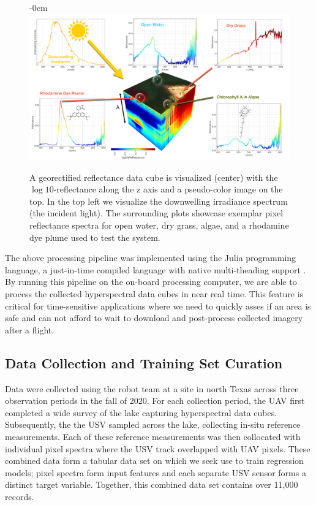 \documentclass[journal,article,submit,pdftex,moreauthors]{Definitions/mdpi}
\begin{document}
\begin{figure}[H]
\begin{adjustwidth}{-\extralength}{0cm}
\centering
\includegraphics[width=15.5cm]{paper/figures/materials-and-methods/HyperSpectralInfoGraphic.pdf}
\end{adjustwidth}
\caption{A georectified reflectance data cube is visualized (center) with the $\log10$-reflectance along the z axis and a pseudo-color image on the top. In the top left we visualize the downwelling irradiance spectrum (the incident light). The surrounding plots showcase exemplar pixel reflectance spectra for open water, dry grass, algae, and a rhodamine dye plume used to test the system.\label{fig:hsi-infographic}}
\end{figure}  
The above processing pipeline was implemented using the Julia programming language, a just-in-time compiled language with native multi-theading support \cite{julia-1}. By running this pipeline on the on-board processing computer, we are able to process the collected hyperspectral data cubes in near real time. This feature is critical for time-sensitive applications where we need to quickly asses if an area is safe and can not afford to wait to download and post-process collected imagery after a flight.

\subsection{Data Collection and Training Set Curation}

Data were collected using the robot team at a site in north Texas across three observation periods in the fall of 2020. For each collection period, the UAV first completed a wide survey of the lake capturing hyperspectral data cubes. Subsequently, the the USV sampled across the lake, collecting in-situ reference measurements. Each of these reference measurements was then collocated with individual pixel spectra where the USV track overlapped with UAV pixels. These combined data form a tabular data set on which we seek use to train regression models; pixel spectra form input features and each separate USV sensor forms a distinct target variable. Together, this combined data set contains over 11,000 records.
\end{document}
